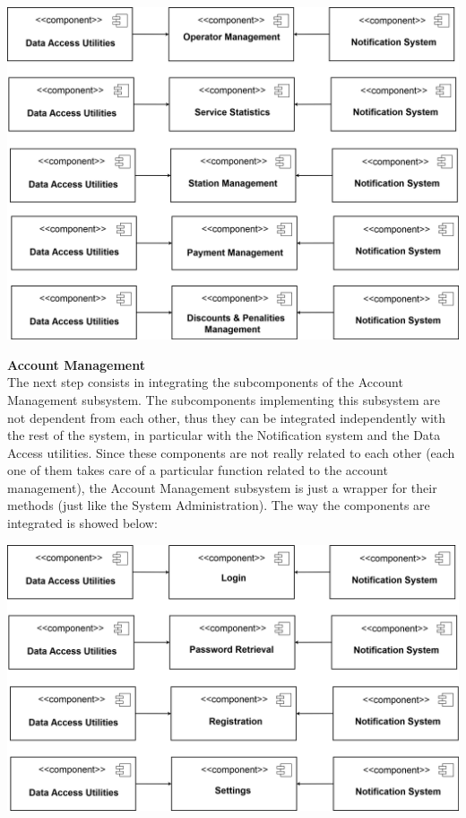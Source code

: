 \documentclass{article}
\begin{document}
\begin{flushleft}
  \includegraphics[scale=0.15]{Diagramma6}
  \newpage
  
  
  
  \textbf{Account Management} \\
  
  The next step consists in integrating the subcomponents of the Account Management subsystem. The subcomponents implementing this subsystem are not dependent from each other, thus they can be integrated independently with the rest of the system, in particular with the Notification system and the Data Access utilities.  Since these components are not really related to each other (each one of them takes care of a particular function related to the account management), the Account  Management subsystem is just a wrapper for their methods (just like the System Administration). The way the components are integrated is showed below:\\
  
  
  
   \vspace{1cm}
  
  \includegraphics[scale=0.15]{Diagramma7}
  

\end{flushleft}
\end{document}
